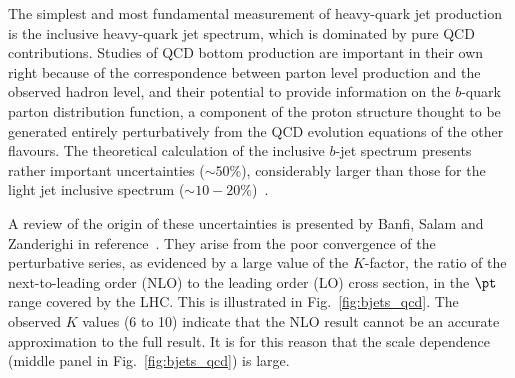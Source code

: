 
The simplest and most fundamental measurement of heavy-quark jet production is
the inclusive heavy-quark jet spectrum, which is dominated by pure QCD contributions. 
Studies of QCD bottom production are important in their own right because of the correspondence between parton level production and the observed hadron level, and their potential to provide information on the $b$-quark parton distribution function, a component of the proton structure thought to be generated entirely perturbatively from the QCD evolution equations of the other flavours. The theoretical calculation of the inclusive $b$-jet spectrum presents rather important uncertainties ($\sim 50\%$), considerably larger than those for the light jet inclusive spectrum ($\sim 10-20\%$)~\cite{Frixione:1996nh}. 

A review of the origin of these uncertainties is presented by Banfi, Salam and Zanderighi in reference~\cite{Salam.AccurateHQ}.  They arise from the poor convergence of the perturbative series, as evidenced by a large value of the $K$-factor, the ratio of the next-to-leading order (NLO) to the leading order (LO) cross section, in the $\pt$ range covered by the LHC.  This is illustrated in Fig.~\ref{fig:bjets_qcd}.  The observed $K$ values (6 to 10) indicate that the NLO result cannot be an accurate approximation to the full result. It is for this reason that the scale dependence (middle panel in Fig.~\ref{fig:bjets_qcd}) is large. 


